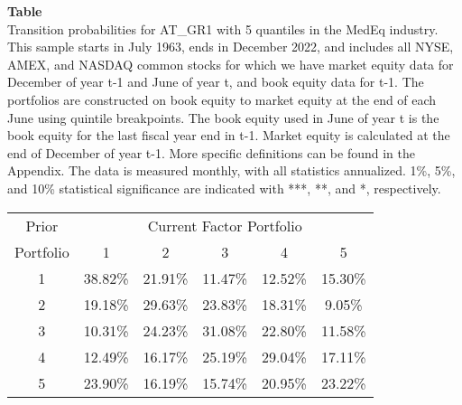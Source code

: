 \begin{table*}[ht!]
\raggedright
{}
\label{tab: transition_probs_AT_GR1_MedEq_with_5_quantiles}
\textbf{Table \thetable} \\
Transition probabilities for AT_GR1 with 5 quantiles in the MedEq industry. \\
\hspace*{1em}This sample starts in July 1963, ends in December 2022, and includes all NYSE, AMEX, and NASDAQ common stocks for which we have market equity data for December of year t-1 and June of year t, and book equity data for t-1. The portfolios are constructed on book equity to market equity at the end of each June using quintile breakpoints.  The book equity used in June of year t is the book equity for the last fiscal year end in t-1.  Market equity is calculated at the end of December of year t-1.  More specific definitions can be found in the Appendix.  The data is measured monthly, with all statistics annualized.  1\%, 5\%, and 10\% statistical significance are indicated with ***, **, and *, respectively. \\
\vspace{0.5em}
\centering
\begin{adjustbox}{max width=\textwidth}
\begin{tabular}{@{}cccccc@{}}
\toprule
Prior & \multicolumn{5}{c}{Current Factor Portfolio} \\
Portfolio & 1 & 2 & 3 & 4 & 5 \\
\midrule
1 & 38.82\% & 21.91\% & 11.47\% & 12.52\% & 15.30\% \\
2 & 19.18\% & 29.63\% & 23.83\% & 18.31\% & 9.05\% \\
3 & 10.31\% & 24.23\% & 31.08\% & 22.80\% & 11.58\% \\
4 & 12.49\% & 16.17\% & 25.19\% & 29.04\% & 17.11\% \\
5 & 23.90\% & 16.19\% & 15.74\% & 20.95\% & 23.22\% \\
\bottomrule
\end{tabular}
\end{adjustbox}
\end{table*}